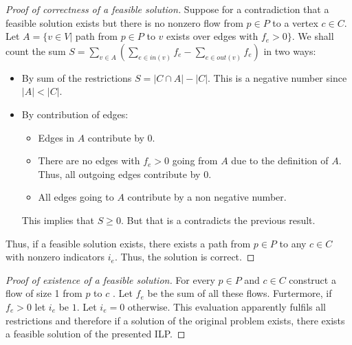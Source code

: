 \begin{proof}[Proof of correctness of a feasible solution]
  Suppose for a contradiction that a feasible solution exists but there is no nonzero flow from $p \in P$ to a vertex $c \in C$. Let $A = \{v \in V | $ path from $p \in P$ to $v$ exists over edges with $ f_e \gt 0\}$. We shall count the sum $S = \sum_{v \in A}(\sum_{e \in in(v)} f_e - \sum_{e \in out(v)} f_e)$ in two ways:
  \begin{itemize}
    \item By sum of the restrictions $S = | C \cap A | - | C |$. This is a negative number since $| A | \lt | C |$.
    \item By contribution of edges:
      \begin{itemize}
        \item Edges in $A$ contribute by $0$.
        \item There are no edges with $f_e \gt 0$ going from $A$ due to the definition of $A$. Thus, all outgoing edges contribute by $0$.
        \item All edges going to $A$ contribute by a non negative number.
      \end{itemize}
      This implies that $S \geq 0$. But that is a contradicts the previous result.
    \end{itemize}
  Thus, if a feasible solution exists, there exists a path from $p \in P$ to any $c \in C$ with nonzero indicators $i_e$. Thus, the solution is correct.
\end{proof}
\begin{proof}[Proof of existence of a feasible solution]
  For every $p \in P$ and $c \in C$ construct a flow of size 1 from $p$ to $c$ . Let $f_e$ be the sum of all these flows. Furtermore, if $f_e \gt 0$ let $i_e$ be $1$. Let $i_e = 0$ otherwise. This evaluation apparently fulfils all restrictions and therefore if a solution of the original problem exists, there exists a feasible solution of the presented ILP.
\end{proof}
\myendalg
